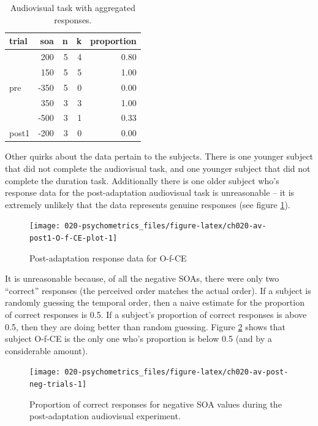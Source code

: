 \documentclass[11pt, oneside, openany]{scrbook}
\begin{document}
\begin{table}[!h]

\caption{\label{tab:ch020-av-bin-sample}Audiovisual task with aggregated responses.}
\centering
\begin{tabular}[t]{lrrrr}
\toprule
trial & soa & n & k & proportion\\
\midrule
 & 200 & 5 & 4 & 0.80\\
\cmidrule{2-5}
 & 150 & 5 & 5 & 1.00\\
\cmidrule{2-5}
\multirow[t]{-3}{*}{\raggedright\arraybackslash pre} & -350 & 5 & 0 & 0.00\\
\cmidrule{1-5}
 & 350 & 3 & 3 & 1.00\\
\cmidrule{2-5}
 & -500 & 3 & 1 & 0.33\\
\cmidrule{2-5}
\multirow[t]{-3}{*}{\raggedright\arraybackslash post1} & -200 & 3 & 0 & 0.00\\
\bottomrule
\end{tabular}
\end{table}

Other quirks about the data pertain to the subjects. There is one younger subject that did not complete the audiovisual task, and one younger subject that did not complete the duration task. Additionally there is one older subject who's response data for the post-adaptation audiovisual task is unreasonable -- it is extremely unlikely that the data represents genuine responses (see figure \ref{fig:ch020-av-post1-O-f-CE-plot}).

\begin{figure}

{\centering \texttt{[image: 020-psychometrics\_files/figure-latex/ch020-av-post1-O-f-CE-plot-1]} 

}

\caption{Post-adaptation response data for O-f-CE}\label{fig:ch020-av-post1-O-f-CE-plot}
\end{figure}

It is unreasonable because, of all the negative SOAs, there were only two ``correct'' responses (the perceived order matches the actual order). If a subject is randomly guessing the temporal order, then a naive estimate for the proportion of correct responses is 0.5. If a subject's proportion of correct responses is above 0.5, then they are doing better than random guessing. Figure \ref{fig:ch020-av-post-neg-trials} shows that subject O-f-CE is the only one who's proportion is below 0.5 (and by a considerable amount).

\begin{figure}

{\centering \texttt{[image: 020-psychometrics\_files/figure-latex/ch020-av-post-neg-trials-1]} 

}

\caption{Proportion of correct responses for negative SOA values during the post-adaptation audiovisual experiment.}\label{fig:ch020-av-post-neg-trials}
\end{figure}
\end{document}
